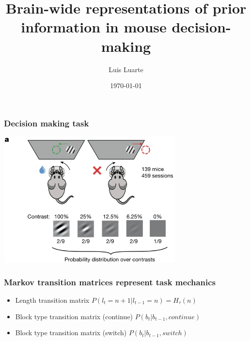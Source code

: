 \documentclass{beamer}
\title{Brain-wide representations of prior information in mouse decision-making}
\author{Luis Luarte}
\institute{UDD}
\date{\today}
\begin{document}
\begin{frame}
  \titlepage
\end{frame}

\begin{frame}
  \frametitle{Decision making task}
  \begin{center}
    \includegraphics[width=0.7\textwidth, keepaspectratio]{./figure1a}
  \end{center}
\end{frame}

\begin{frame}
  \frametitle{Markov transition matrices represent task mechanics}
  \begin{itemize}
    \item Length transition matrix $P(l_{t} = n + 1 | l_{t-1} = n) = H_{\tau}(n)$
    \item Block type transition matrix (continue) $P(b_{t} | b_{t-1}, continue)$
    \item Block type transition matrix (switch) $P(b_{t} | b_{t-1}, switch)$
  \end{itemize}
\end{frame}
\end{document}
